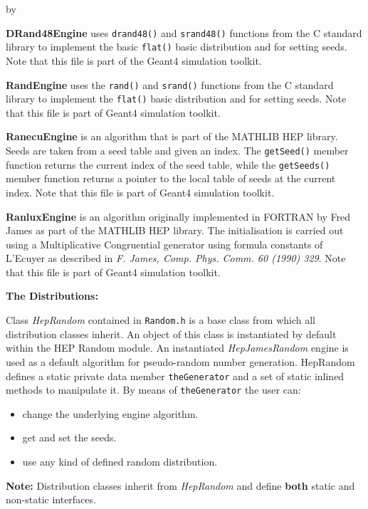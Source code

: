\documentclass[twoside]{article}
\newcommand{\comp}[1]{\texttt{#1}}%
\newcommand{\entrylabel}[1]{\mbox{\textbf{{#1}}}\hfil}%
\newenvironment{entry}
{\begin{list}{}%
    {\renewcommand{\makelabel}{\entrylabel}%
     \setlength{\labelwidth}{90pt}%
     \setlength{\leftmargin}{\labelwidth}
     \advance\leftmargin by \labelsep%
      }%
    }%
  {\end{list}}
\newcommand{\Entrylabel}[1]%
{\raisebox{0pt}[1ex][0pt]{\makebox[\labelwidth][l]%
    {\parbox[t]{\labelwidth}{\hspace{0pt}\textbf{{#1}}}}}}
\newenvironment{Entry}%
{\renewcommand{\entrylabel}{\Entrylabel}\begin{entry}}%
  {\end{entry}}
\begin{document}
\begin{Entry}
\begin{description}
       \item {\bf DRand48Engine} uses \comp{drand48()}
         and \comp{srand48()} functions from the C standard library
         to implement the basic \comp{flat()} basic distribution and
         for setting seeds.  Note that this file is part of the
         Geant4  simulation toolkit.

       \item {\bf RandEngine} uses the \comp{rand()} and \comp{srand()}
         functions from the C standard library to implement the \comp{flat()}
         basic distribution and for setting seeds.  Note that this file is
         part of Geant4 simulation toolkit.

       \item {\bf RanecuEngine} is an algorithm that is part of the
         MATHLIB HEP library.  Seeds are taken from a seed table
         and given an index.  The \comp{getSeed()} member function
         returns the current index of the seed table, while the
         \comp{getSeeds()} member function returns a pointer to the
         local table of seeds at the current index.  Note that this file
         is part of Geant4 simulation toolkit.

       \item {\bf RanluxEngine} is an algorithm originally implemented
         in FORTRAN by Fred James as part of the MATHLIB HEP
         library.  The initialisation is carried out using a
         Multiplicative Congruential generator using formula constants
         of L'Ecuyer as described in {\em F. James, Comp. Phys. Comm. 60 (1990) 329}.
         Note that this file is part of Geant4 simulation toolkit.
     \end{description}

  {\bf The Distributions:}
  
     Class {\em HepRandom} contained in \comp{Random.h} is a base class
     from which all distribution
     classes inherit.  An object of this class is instantiated by
     default within the HEP Random module.  An instantiated {\em HepJamesRandom}
     engine is used as a default algorithm for pseudo-random number
     generation.  HepRandom defines a static private data member
     \comp{theGenerator} and a set of static inlined methods to
     manipulate it. By means of \comp{theGenerator} the user can:
     \begin{itemize}
        \item change the underlying engine algorithm.
        \item get and set the seeds.
        \item use any kind of defined random distribution.
      \end{itemize}
      {\bf Note:} Distribution classes inherit from {\em HepRandom} and define
      {\bf both} static and non-static interfaces.


\end{Entry}
\end{document}
